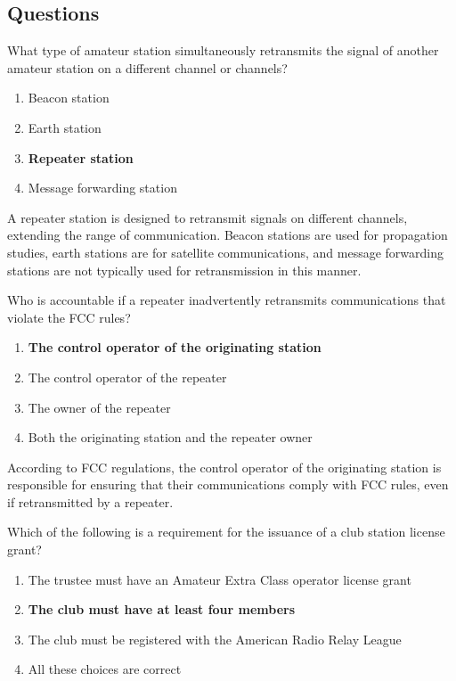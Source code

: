 \subsection*{Questions}

\begin{tcolorbox}[colback=gray!10!white,colframe=black!75!black,title={T1F09}]
What type of amateur station simultaneously retransmits the signal of another amateur station on a different channel or channels?
\begin{enumerate}[label=\Alph*),noitemsep]
    \item Beacon station
    \item Earth station
    \item \textbf{Repeater station}
    \item Message forwarding station
\end{enumerate}
\end{tcolorbox}

A repeater station is designed to retransmit signals on different channels, extending the range of communication. Beacon stations are used for propagation studies, earth stations are for satellite communications, and message forwarding stations are not typically used for retransmission in this manner.


\begin{tcolorbox}[colback=gray!10!white,colframe=black!75!black,title={T1F10}]
Who is accountable if a repeater inadvertently retransmits communications that violate the FCC rules?
\begin{enumerate}[label=\Alph*),noitemsep]
    \item \textbf{The control operator of the originating station}
    \item The control operator of the repeater
    \item The owner of the repeater
    \item Both the originating station and the repeater owner
\end{enumerate}
\end{tcolorbox}

According to FCC regulations, the control operator of the originating station is responsible for ensuring that their communications comply with FCC rules, even if retransmitted by a repeater.


\begin{tcolorbox}[colback=gray!10!white,colframe=black!75!black,title={T1F11}]
Which of the following is a requirement for the issuance of a club station license grant?
\begin{enumerate}[label=\Alph*),noitemsep]
    \item The trustee must have an Amateur Extra Class operator license grant
    \item \textbf{The club must have at least four members}
    \item The club must be registered with the American Radio Relay League
    \item All these choices are correct
\end{enumerate}
\end{tcolorbox}

